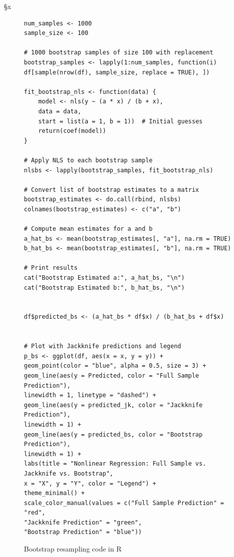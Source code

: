 §x\documentclass[]{article}
\begin{document}
\begin{figure}[H]
	\captionsetup{type=lstlisting}
	\begin{lstlisting}
num_samples <- 1000
sample_size <- 100

# 1000 bootstrap samples of size 100 with replacement
bootstrap_samples <- lapply(1:num_samples, function(i) df[sample(nrow(df), sample_size, replace = TRUE), ])

fit_bootstrap_nls <- function(data) {
	model <- nls(y ~ (a * x) / (b + x),
	data = data,
	start = list(a = 1, b = 1))  # Initial guesses
	return(coef(model))
}

# Apply NLS to each bootstrap sample
nlsbs <- lapply(bootstrap_samples, fit_bootstrap_nls)

# Convert list of bootstrap estimates to a matrix
bootstrap_estimates <- do.call(rbind, nlsbs)
colnames(bootstrap_estimates) <- c("a", "b")

# Compute mean estimates for a and b
a_hat_bs <- mean(bootstrap_estimates[, "a"], na.rm = TRUE)
b_hat_bs <- mean(bootstrap_estimates[, "b"], na.rm = TRUE)

# Print results
cat("Bootstrap Estimated a:", a_hat_bs, "\n")
cat("Bootstrap Estimated b:", b_hat_bs, "\n")


df$predicted_bs <- (a_hat_bs * df$x) / (b_hat_bs + df$x)


# Plot with Jackknife predictions and legend
p_bs <- ggplot(df, aes(x = x, y = y)) +
geom_point(color = "blue", alpha = 0.5, size = 3) +
geom_line(aes(y = Predicted, color = "Full Sample Prediction"),
linewidth = 1, linetype = "dashed") +
geom_line(aes(y = predicted_jk, color = "Jackknife Prediction"),
linewidth = 1) +
geom_line(aes(y = predicted_bs, color = "Bootstrap Prediction"),
linewidth = 1) +
labs(title = "Nonlinear Regression: Full Sample vs. Jackknife vs. Bootstrap",
x = "X", y = "Y", color = "Legend") +
theme_minimal() +
scale_color_manual(values = c("Full Sample Prediction" = "red",
"Jackknife Prediction" = "green",
"Bootstrap Prediction" = "blue"))
	\end{lstlisting}
	\caption{Bootstrap resampling code in R}
	\label{lst:bs}
\end{figure}
\end{document}
